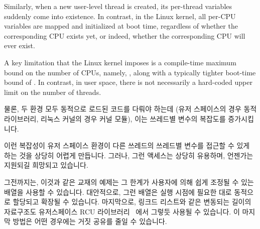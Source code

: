 {	Similarly, when a new user-level thread is created, its
	per-thread variables suddenly come into existence.
	In contrast, in the Linux kernel, all per-CPU variables are
	mapped and initialized at boot time, regardless of whether
	the corresponding CPU exists yet, or indeed, whether the
	corresponding CPU will ever exist.

	A key limitation that the Linux kernel imposes is a compile-time
	maximum bound on the number of CPUs, namely, ,
	along with a typically tighter boot-time bound of .
	In contrast, in user space, there is not necessarily a hard-coded
	upper limit on the number of threads.

	\fi

	물론, 두 환경 모두 동적으로 로드된 코드를 다뤄야 하는데 (유저
	스페이스의 경우 동적 라이브러리, 리눅스 커널의 경우 커널 모듈), 이는
	쓰레드별 변수의 복잡도를 증가시킵니다.

	이런 복잡성이 유저 스페이스 환경이 다른 쓰레드의 쓰레드별 변수를 접근할
	수 있게 하는 것을 상당히 어렵게 만듭니다.
	그러나, 그런 액세스는 상당히 유용하며, 언젠가는 지원되길 희망되고
	있습니다.

	그전까지는, 이것과 같은 교재의 예제는 그 한계가 사용자에 의해 쉽게
	조정될 수 있는 배열을 사용할 수 있습니다.
	대안적으로, 그런 배열은 실행 시점에 필요한 대로 동적으로 할당되고
	확장될 수 있습니다.
	마지막으로, 링크드 리스트와 같은 변동되는 길이의 자료구조도
	유저스페이스 RCU
	라이브러리~\cite{MathieuDesnoyers2009URCU,MathieuDesnoyers2012URCU}
	에서 그렇듯 사용될 수 있습니다.
	이 마지막 방법은 어떤 경우에는 거짓 공유를 줄일 수 있습니다.

}\QuickQuizEnd


